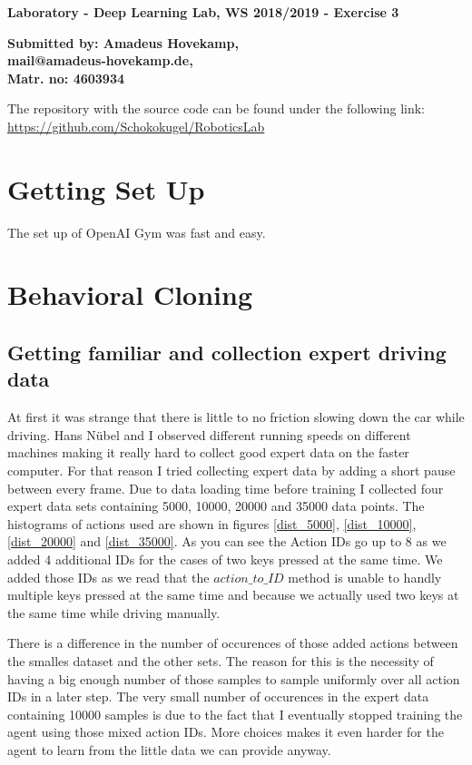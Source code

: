 \documentclass[
        a4paper,
        10pt,
        parskip = full,    %
    ]{scrartcl}
\begin{document}
\textbf{\large{Laboratory - Deep Learning Lab, WS 2018/2019 - Exercise 3}}

\textbf{\large{Submitted by: Amadeus Hovekamp,\\
mail@amadeus-hovekamp.de,\\
Matr. no: 4603934}}

The repository with the source code can be found under the following link:\\
\href{https://github.com/Schokokugel/RoboticsLab}
     {https://github.com/Schokokugel/RoboticsLab}

\section{Getting Set Up}

The set up of OpenAI Gym was fast and easy.

\section{Behavioral Cloning}
\subsection{Getting familiar and collection expert driving data}
At first it was strange that there is little to no friction slowing down the car
while driving. Hans N\"ubel and I observed different running speeds on different
machines making it really hard to collect good expert data on the faster computer.
For that reason I tried collecting expert data by adding a short pause between
every frame. Due to data loading time before training I collected four expert
data sets containing 5000, 10000, 20000 and 35000 data points. The histograms of actions
used are shown in figures \ref{dist_5000},  \ref{dist_10000}, \ref{dist_20000} and \ref{dist_35000}. As you can see the Action IDs go up to 8 as we added 4 additional IDs for the cases of two keys pressed at the same time. We added those IDs as we read that the $action\_to\_ID$ method is unable to handly multiple keys pressed at the same time and because we actually used two keys at the same time while driving manually.

There is a difference in the number of occurences of those added actions between the smalles dataset and the other sets. The reason for this is the necessity of having a big enough number of those samples to sample uniformly over all action IDs in a later step. The very small number of occurences in the expert data containing 10000 samples is due to the fact that I eventually stopped training the agent using those mixed action IDs. More choices makes it even harder for the agent to learn from the little data we can provide anyway.
\end{document}
